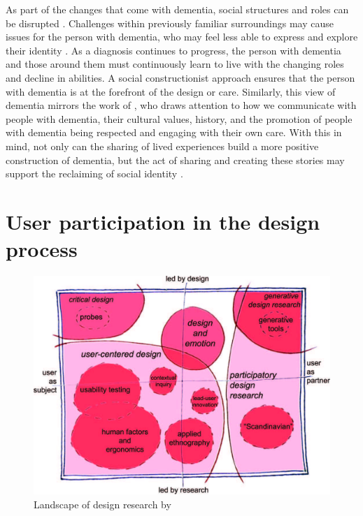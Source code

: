 As part of the changes that come with dementia, social structures and roles can be disrupted \citep{hampson_dementia:_2016}. Challenges within previously familiar surroundings may cause issues for the person with dementia, who may feel less able to express and explore their identity \citep{john_killick_claire_craig_creativity_2012}. As a diagnosis continues to progress, the person with dementia and those around them must continuously learn to live with the changing roles and decline in abilities. A social constructionist approach ensures that the person with dementia is at the forefront of the design or care. Similarly, this view of dementia mirrors the work of \cite{kitwood1997dementia}, who draws attention to how we communicate with people with dementia, their cultural values, history, and the promotion of people with dementia being respected and engaging with their own care. With this in mind, not only can the sharing of lived experiences build a more positive construction of dementia, but the act of sharing and creating these stories may support the reclaiming of social identity \citep{ryan_dementia_2009}.

\section{User participation in the design process}
\label{ParticipationDesignProcess}

\begin{figure}[htp]
    \centering
    \includegraphics[width=0.6\linewidth]{Images/Methodology/Landscape_of_Design.jpg}
    \caption{Landscape of design research by  \citeauthor{sanders2008co}}
    \label{fig:LandscapeOfDesign}
\end{figure}

